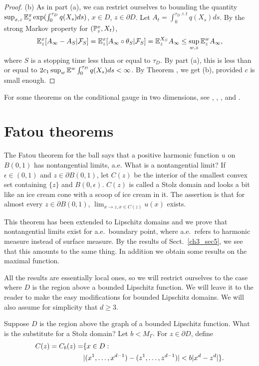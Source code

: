 \begin{proof}
(b) As in part (a), we can restrict ourselves to bounding the quantity $\sup_{x,z} \E_z^x\exp(\int_0^{\tau_D} q(X_s)ds)$, $x \in D$, $z \in \partial D$. Let $A_t = \int_0^{\tau_D \wedge t} q(X_s)ds$. By the strong Markov property for $(\P_z^x,X_t)$,
\[
    \E_z^x[A_\infty - A_S\mid \FC_S] = \E_z^x[A_\infty \circ \theta_S\mid \FC_S] = \E_z^{X_S}A_\infty \leq \sup_{w,z} \E_z^wA_\infty,
\]
where $S$ is a stopping time less than or equal to $\tau_D$. By part (a), this is less than or equal to $2c_1\sup_w \E^w \int_0^{\tau_D} q(X_s)ds < \infty$. By Theorem , we get (b), provided $c$ is small enough.
\end{proof}

For some theorems on the conditional gauge in two dimensions, see \cite{Cranston1989}, \cite{Zhao1988}, \cite{McConnell1990}, and \cite{BassBurdzy1994b}.

\section{Fatou theorems}\label{ch3_sec4}


The Fatou theorem for the ball says that a positive harmonic function $u$ on $B(0,1)$ has nontangential limits, a.e. What is a nontangential limit? If $\epsilon \in (0,1)$ and $z \in \partial B(0,1)$, let $C(z)$ be the interior of the smallest convex set containing $\{z\}$ and $B(0,\epsilon)$. $C(z)$ is called a Stolz domain and looks a bit like an ice cream cone with a scoop of ice cream in it. The assertion is that for almost every $z \in \partial B(0,1)$, $\lim_{x \to z,x\in C(z)} u(x)$ exists.

This theorem has been extended to Lipschitz domains and we prove that nontangential limits exist for a.e.\ boundary point, where a.e.\ refers to harmonic measure instead of surface measure. By the results of Sect.\ \ref{ch3_sec5}, we see that this amounts to the same thing. In addition we obtain some results on the maximal function.

All the results are essentially local ones, so we will restrict ourselves to the case where $D$ is the region above a bounded Lipschitz function. We will leave it to the reader to make the easy modifications for bounded Lipschitz domains. We will also assume for simplicity that $d \geq 3$.

Suppose $D$ is the region above the graph of a bounded Lipschitz function. What is the substitute for a Stolz domain? Let $b < M_\Gamma$. For $z \in \partial D$, define
\begin{align}\label{eq:ch3_4.1}
    C(z) = C_b(z) = &\{x \in D : \\
    & |(x^1,\ldots,x^{d-1}) - (z^1,\ldots,z^{d-1})| < b|x^d - z^d|\}. \notag
\end{align}

